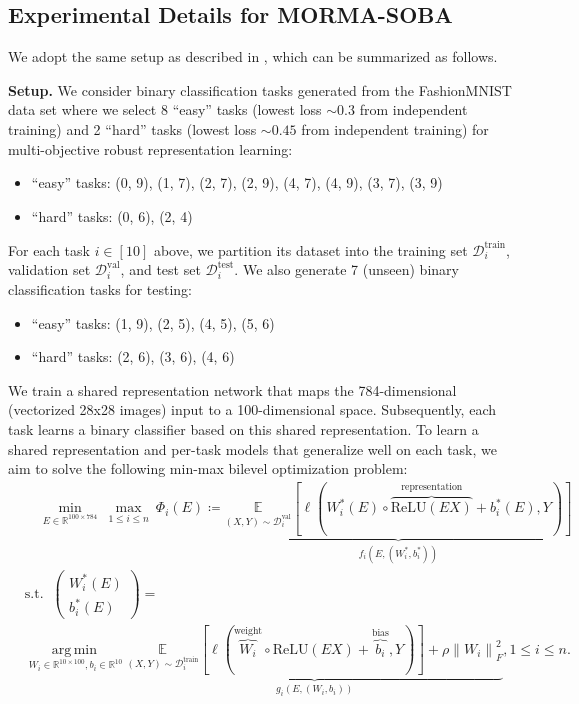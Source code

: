 \documentclass[10pt]{article}
\theoremstyle{remark}
\newcommand{\cD}{\mathcal{D}}
\newcommand{\realset}{\mathbb{R}}
\newcommand{\E}{\mathbb{E}}
\newcommand{\norm}[1]{\left\|#1\right\|}
\DeclareMathOperator*{\argmin}{arg\,min\,}
\begin{document}
\subsection{Experimental Details for MORMA-SOBA}

We adopt the same setup as described in \cite{gu2022min}, which can be summarized as follows.

\textbf{Setup.} We consider binary classification tasks generated from the FashionMNIST data set where we select 8 ``easy'' tasks (lowest loss $\sim 0.3$ from independent training) and 2 ``hard'' tasks (lowest loss  $\sim 0.45$ from independent training) for multi-objective robust representation learning:
\begin{itemize}
    \item ``easy'' tasks: (0, 9), (1, 7), (2, 7), (2, 9), (4, 7), (4, 9), (3, 7), (3, 9)
    \item ``hard'' tasks: (0, 6), (2, 4)
\end{itemize}
For each task $i\in[10]$ above, we partition its dataset into the training set $\cD_i^{\text{train}}$, validation set $\cD_i^{\text{val}}$, and test set $\cD_{i}^{\text{test}}$. We also generate 7 (unseen) binary classification tasks for testing:
\begin{itemize}
    \item ``easy'' tasks: (1, 9), (2, 5), (4, 5), (5, 6)
    \item ``hard'' tasks: (2, 6), (3, 6), (4, 6)
\end{itemize}
We train a shared representation network that maps the 784-dimensional (vectorized 28x28 images) input to a 100-dimensional space. Subsequently, each task learns a binary classifier based on this shared representation. To learn a shared representation and per-task models that generalize well on each task, we aim to solve the following min-max bilevel optimization problem:
\begin{equation*}
\begin{split}
        &\quad \underset{E\in \realset^{100\times 784}}{\min}\ \max_{1\leq i \leq n } \ \Phi_i(E) \coloneqq \underbrace{\underset{(X, Y)\sim \cD_i^{\text{val}}}{\E}\left[\ell\left( W_i^*(E) \circ\overbrace{\text{ReLU}(EX)}^{\text{representation}} + b_i^*(E), Y\right)\right]}_{f_i(E, (W_i^*, b_i^*))} \\
        &\text{s.t. }\ \begin{pmatrix}W_i^*(E)\\ b_i^*(E)\end{pmatrix} = \\
        &\underset{W_i\in\realset^{10\times 100},b_i\in\realset^{10}}{\argmin} \underbrace{\underset{(X, Y)\sim \cD_i^{\text{train}}}{\E}\left[\ell\left(\overbrace{W_i}^{\text{weight}} \circ \text{ReLU}(EX) + \overbrace{b_i}^{\text{bias}}, Y\right)\right]+ \rho\norm{W_i}_F^2}_{g_i(E, (W_i, b_i))} , 1\leq i\leq n.
\end{split}
\end{equation*}
\end{document}
